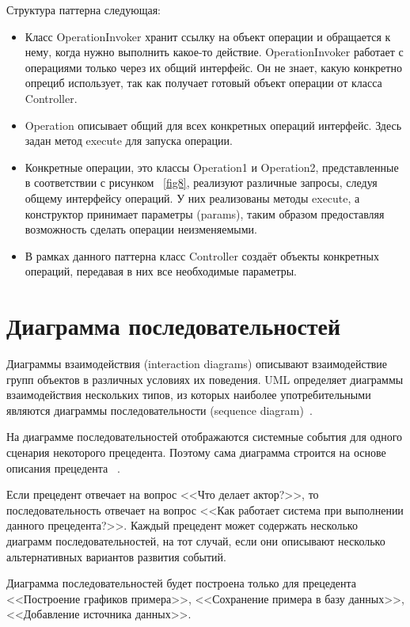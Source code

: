 \documentclass[14pt]{extreport}
\begin{document}
Структура паттерна следующая: 
\begin{itemize}
\item Класс OperationInvoker хранит ссылку на объект операции и обращается к нему, когда нужно выполнить какое-то действие. OperationInvoker работает с операциями только через их общий интерфейс. Он не знает, какую конкретно опрециб использует, так как получает готовый объект операции от класса Controller.

\item Operation описывает общий для всех конкретных операций интерфейс. Здесь задан метод execute для запуска операции.

\item Конкретные операции, это классы Operation1 и Operation2, представленные в соответствии с рисунком ~\ref{fig8}, реализуют различные запросы, следуя общему интерфейсу операций. У них реализованы методы execute, а конструктор принимает параметры (params), таким образом предоставляя возможность сделать операции неизменяемыми.

\item В рамках данного паттерна класс Controller создаёт объекты конкретных операций, передавая в них все необходимые параметры.
\end{itemize}

\section{Диаграмма последовательностей}
Диаграммы взаимодействия (interaction diagrams) описывают взаимодействие групп объектов в различных условиях их поведения. UML определяет диаграммы взаимодействия нескольких типов, из которых наиболее употребительными являются диаграммы последовательности (sequence diagram)~\cite{umlDistilled}.

На диаграмме последовательностей отображаются системные события для одного
сценария некоторого прецедента. Поэтому сама диаграмма строится на основе описания
прецедента ~\cite{umlApplying}. 

Если прецедент отвечает на вопрос <<Что делает актор?>>, то последовательность отвечает на вопрос <<Как работает система при выполнении данного прецедента?>>.
Каждый прецедент может содержать несколько диаграмм последовательностей, на тот случай, если они описывают несколько альтернативных вариантов развития событий.

Диаграмма последовательностей будет построена только для прецедента <<Построение графиков примера>>, <<Сохранение примера в базу данных>>, <<Добавление источника 
данных>>.
\end{document}
